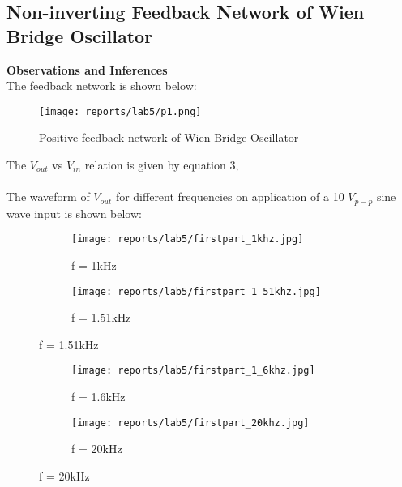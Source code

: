 \documentclass[12pt]{article}
\begin{document}
    \subsection{Non-inverting Feedback Network of Wien Bridge Oscillator}
            
        \noindent
        \textbf{Observations and Inferences}\\
        
        \noindent
        The feedback network is shown below:
        \begin{figure}[H]
            \centering
            \texttt{[image: reports/lab5/p1.png]}
            \caption{Positive feedback network of Wien Bridge Oscillator}
        \end{figure}
        \noindent
        The $V_{out}$ vs $V_{in}$ relation is given by equation 3,
        \\\\
        \noindent
        The waveform of $V_{out}$ for different frequencies on application of a 10 $V_{p-p}$ sine wave input is shown below:
        \begin{figure}[H]
            \centering
            \begin{subfigure}{.5\textwidth}
                \centering
                \texttt{[image: reports/lab5/firstpart\_1khz.jpg]}
                \caption{f = 1kHz}
            \end{subfigure}%
            \begin{subfigure}{.5\textwidth}
                \centering
                \texttt{[image: reports/lab5/firstpart\_1\_51khz.jpg]}
                \caption{f = 1.51kHz}
            \end{subfigure}%
        \end{figure}
        \begin{figure}[H]
            \centering
            \begin{subfigure}{.5\textwidth}
                \centering
                \texttt{[image: reports/lab5/firstpart\_1\_6khz.jpg]}
                \caption{f = 1.6kHz}
            \end{subfigure}%
            \begin{subfigure}{.5\textwidth}
                \centering
                \texttt{[image: reports/lab5/firstpart\_20khz.jpg]}
                \caption{f = 20kHz}
            \end{subfigure}%
        \end{figure}
\end{document}

